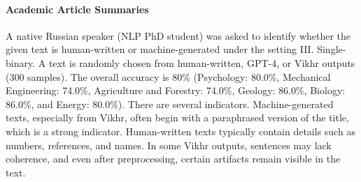 

\paragraph{Academic Article Summaries}
A native Russian speaker (NLP PhD student) was asked to identify whether the given text is human-written or machine-generated under the setting III. Single-binary. A text is randomly chosen from human-written, GPT-4, or Vikhr outputs (300 samples).
The overall accuracy is 80\% (Psychology: 80.0\%, Mechanical Engineering: 74.0\%, Agriculture and Forestry: 74.0\%, Geology: 86.0\%, Biology: 86.0\%, and Energy: 80.0\%).
There are several indicators. Machine-generated texts, especially from Vikhr, often begin with a paraphrased version of the title, which is a strong indicator. Human-written texts typically contain details such as numbers, references, and names. In some Vikhr outputs, sentences may lack coherence, and even after preprocessing, certain artifacts remain visible in the text.








